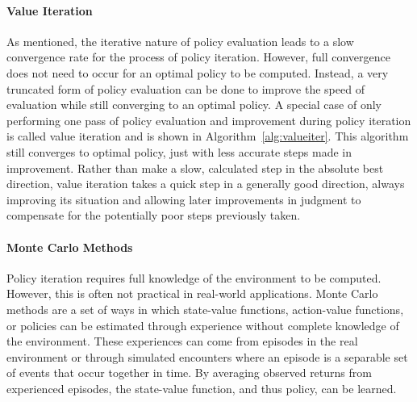 

\paragraph*{Value Iteration}

As mentioned,
the iterative nature of policy evaluation leads to a slow convergence rate
for the process of policy iteration.
%
However,
full convergence does not need to occur for an optimal policy to be computed.
%
Instead,
a very truncated form of policy evaluation can be done to improve the speed
of evaluation while still converging to an optimal policy.
%
A special case of only performing one pass of policy evaluation and improvement
during policy iteration is called value iteration
and is shown in Algorithm~\ref{alg:valueiter}. 
%
This algorithm still converges to optimal policy,
just with less accurate steps made in improvement.
%
Rather than make a slow, calculated step in the absolute best direction,
value iteration takes a quick step in a generally good direction,
always improving its situation and
allowing later improvements in judgment to compensate for the potentially poor
steps previously taken.



\paragraph*{Monte Carlo Methods}


Policy iteration requires full knowledge of the environment to be computed.
%
However,
this is often not practical in real-world applications.
%
Monte Carlo methods are a set of ways in which
state-value functions, action-value functions, or policies can be estimated through experience without
complete knowledge of the environment.
%
These experiences can come from episodes in the real environment
or through simulated encounters
where an episode is a separable set of events that occur together in
time.
%
By averaging observed returns from experienced episodes,
the state-value function,
and thus policy,
can be learned.

